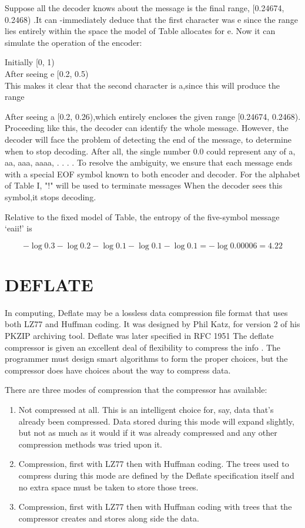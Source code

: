 \documentclass{article}
\begin{document}
Suppose all the decoder knows about the message is the final range, [0.24674, 0.2468) .It can -immediately deduce that the first character was e since the range lies entirely within the space the model of Table allocates for e. Now it can simulate the operation of the encoder:

Initially [0, 1)
\\
After seeing e [0.2, 0.5)
\\

This makes it clear that the second character is a,since this will produce the range

After seeing a [0.2, 0.26),which entirely encloses the given range [0.24674, 0.2468). Proceeding like this, the decoder can identify the whole message. However, the decoder will face the problem of detecting the end of the message, to determine when to stop decoding. After all, the single number 0.0 could represent any of a, aa, aaa, aaaa, . . .  . To resolve the ambiguity, we ensure that each message ends with a special EOF symbol known to both encoder and decoder. For the alphabet of Table I, "!" will be used to terminate messages  When the decoder sees this symbol,it stops decoding. 

Relative to the fixed model of Table, the entropy
of the five-symbol message ‘eaii!’ is 

$$-\log{0.3} - \log{0.2} - \log{0.1} - \log{0.1} - \log{0.1} = -\log{0.00006} =4.22$$



\section{DEFLATE}

In computing, Deflate may be a lossless data compression file format that uses both  LZ77 and Huffman coding. It was designed by Phil Katz, for version 2 of his PKZIP archiving tool. Deflate was later specified in RFC 1951 \cite{deflate}
The deflate compressor is given an excellent deal of flexibility to compress the info . The programmer must design smart algorithms to form the proper choices, but the compressor does have choices about the way to compress data.

There are three modes of compression that the compressor has available:

\begin{enumerate}
	\item Not compressed at all. This is an intelligent choice for, say, data that's already been compressed. Data stored during this mode will expand slightly, but not as much as it would if it was already compressed and any other compression methods was tried upon it.
	
	\item Compression, first with LZ77 then with Huffman coding. The trees used to compress during this mode are defined by the Deflate specification itself and no extra space must be taken to store those trees.
	
	\item Compression, first with LZ77 then with Huffman coding with trees that the compressor creates and stores along side the data.	
\end{enumerate}
\end{document}
